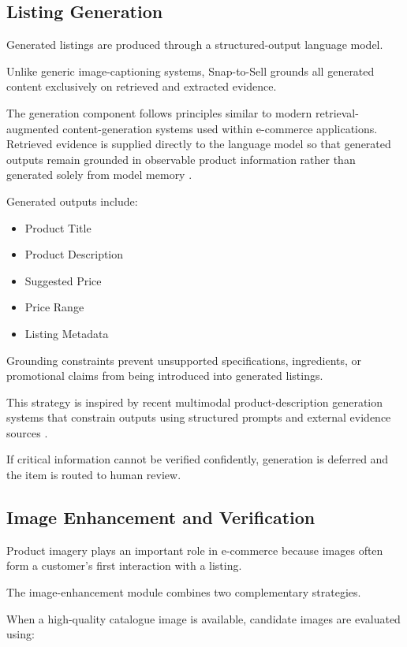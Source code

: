 \documentclass[conference]{IEEEtran}
\begin{document}
\subsection{Listing Generation}

Generated listings are produced through a structured-output language
model.

Unlike generic image-captioning systems, Snap-to-Sell grounds all
generated content exclusively on retrieved and extracted evidence.

The generation component follows principles similar to modern
retrieval-augmented content-generation systems used within e-commerce
applications. Retrieved evidence is supplied directly to the language
model so that generated outputs remain grounded in observable product
information rather than generated solely from model memory
\cite{li2024modict}.

Generated outputs include:

\begin{itemize}
\item Product Title
\item Product Description
\item Suggested Price
\item Price Range
\item Listing Metadata
\end{itemize}

Grounding constraints prevent unsupported specifications,
ingredients, or promotional claims from being introduced into
generated listings.

This strategy is inspired by recent multimodal product-description
generation systems that constrain outputs using structured prompts
and external evidence sources \cite{li2024modict}.

If critical information cannot be verified confidently,
generation is deferred and the item is routed to human review.

\subsection{Image Enhancement and Verification}

Product imagery plays an important role in e-commerce because
images often form a customer's first interaction with a listing.

The image-enhancement module combines two complementary strategies.

When a high-quality catalogue image is available, candidate images
are evaluated using:
\end{document}
